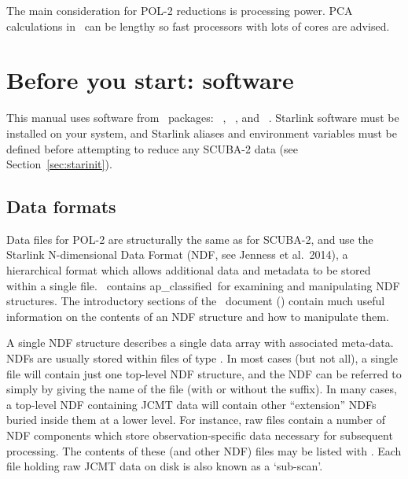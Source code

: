 The main consideration for POL-2 reductions is processing power. PCA calculations in
\makemap\ can be lengthy so fast processors with lots of cores are advised.


\section{Before you start: software}

This manual uses software from \starlink\ packages: \smurf\
\cite{smurf}, \Kappa\ \cite{kappa}, \polpack \cite{polpack} and \gaia\ \cite{gaia}.
Starlink software must be installed on your system, and Starlink
aliases and environment variables must be defined before attempting
to reduce any SCUBA-2 data (see Section~\ref{sec:starinit}).


\subsection{Data formats}
\label{sec:ndf}

Data files for POL-2 are structurally the same as for SCUBA-2, and use
the Starlink N-dimensional Data Format (NDF,
see Jenness et al.\ 2014\cite{ndf}), a hierarchical format which allows
additional data and metadata to be stored within a single file. \Kappa\
contains  {ap_classified}\ for examining and
manipulating NDF structures. The introductory sections of the \Kappa\
document () contain much useful information on
the contents of an NDF structure and how to manipulate them.

A single NDF structure describes a single data array with associated
meta-data. NDFs are usually stored within files of type .
In most cases (but not all), a single  file will contain just
one top-level NDF structure, and the NDF can be referred to simply by
giving the name of the file (with or without the \file{.sdf} suffix).
In many cases, a top-level NDF containing JCMT data will contain other
``extension'' NDFs buried inside them at a lower level. For instance, raw
files contain a number of NDF components which store observation-specific
data necessary for subsequent processing. The contents of these (and
other NDF) files may be listed with \HDSTRACEref. Each file holding raw
JCMT data on disk is also known as a `sub-scan'.

